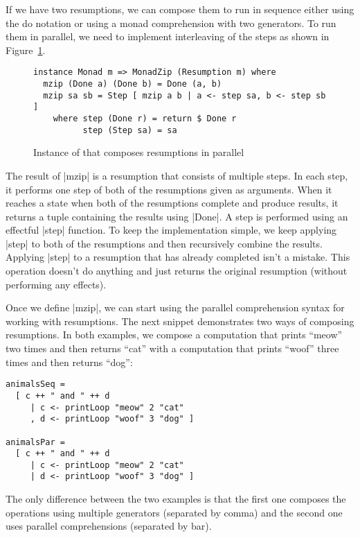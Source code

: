 \documentclass{tmr}
\begin{document}
If we have two resumptions, we can compose them to run in sequence either using the do notation or
using a monad comprehension with two generators. To run them in parallel, we need to implement
interleaving of the steps as shown in Figure~\ref{fig:poorman-zip}. 

\begin{figure}
\begin{verbatim}
instance Monad m => MonadZip (Resumption m) where
  mzip (Done a) (Done b) = Done (a, b)
  mzip sa sb = Step [ mzip a b | a <- step sa, b <- step sb ]
    where step (Done r) = return $ Done r 
          step (Step sa) = sa
\end{verbatim}
\caption{Instance of  that composes resumptions in parallel}
\label{fig:poorman-zip}
\end{figure}

The result of |mzip| is a resumption that consists of multiple steps. In each step, it performs
one step of both of the resumptions given as arguments. When it reaches a state when both of the
resumptions complete and produce results, it returns a tuple containing the results using |Done|.
A step is performed using an effectful |step| function. To keep the implementation simple, we keep
applying |step| to both of the resumptions and then recursively combine the results. Applying
|step| to a resumption that has already completed isn't a mistake. This operation doesn't do 
anything and just returns the original resumption (without performing any effects).

Once we define |mzip|, we can start using the parallel comprehension syntax for working with 
resumptions. The next snippet demonstrates two ways of composing resumptions. In both examples, we 
compose a computation that prints ``meow'' two times and then returns ``cat'' with a computation 
that prints ``woof'' three times and then returns ``dog'':

\begin{verbatim}
animalsSeq = 
  [ c ++ " and " ++ d
     | c <- printLoop "meow" 2 "cat" 
     , d <- printLoop "woof" 3 "dog" ]

animalsPar = 
  [ c ++ " and " ++ d
     | c <- printLoop "meow" 2 "cat" 
     | d <- printLoop "woof" 3 "dog" ]
\end{verbatim}

The only difference between the two examples is that the first one composes the operations using 
multiple generators (separated by comma) and the second one uses parallel comprehensions (separated
by bar).
\end{document}

